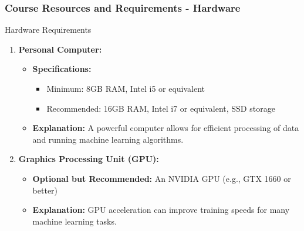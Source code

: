 \documentclass[aspectratio=169]{beamer}
\begin{document}
\begin{frame}[fragile]
    \frametitle{Course Resources and Requirements - Hardware}
    \begin{block}{Hardware Requirements}
        \begin{enumerate}
            \item \textbf{Personal Computer:}
                \begin{itemize}
                    \item \textbf{Specifications:}
                        \begin{itemize}
                            \item Minimum: 8GB RAM, Intel i5 or equivalent
                            \item Recommended: 16GB RAM, Intel i7 or equivalent, SSD storage
                        \end{itemize}
                    \item \textbf{Explanation:} A powerful computer allows for efficient processing of data and running machine learning algorithms.
                \end{itemize}
                
            \item \textbf{Graphics Processing Unit (GPU):}
                \begin{itemize}
                    \item \textbf{Optional but Recommended:} An NVIDIA GPU (e.g., GTX 1660 or better)
                    \item \textbf{Explanation:} GPU acceleration can improve training speeds for many machine learning tasks.
                \end{itemize}
        \end{enumerate}
    \end{block}
\end{frame}
\end{document}
